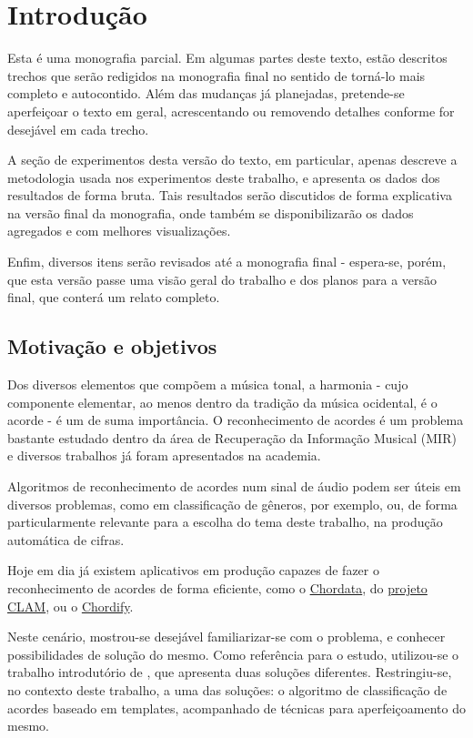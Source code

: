 \chapter{Introdução}
\label{cap:introducao}
    Esta é uma monografia parcial. Em algumas partes deste texto, estão descritos trechos que serão redigidos na monografia final no sentido de torná-lo mais completo e autocontido. Além das mudanças já planejadas, pretende-se aperfeiçoar o texto em geral, acrescentando ou removendo detalhes conforme for desejável em cada trecho.
    
    A seção de experimentos desta versão do texto, em particular, apenas descreve a metodologia usada nos experimentos deste trabalho, e apresenta os dados dos resultados de forma bruta. Tais resultados serão discutidos de forma explicativa na versão final da monografia, onde também se disponibilizarão os dados agregados e com melhores visualizações.
    
    Enfim, diversos itens serão revisados até a monografia final - espera-se, porém, que esta versão passe uma visão geral do trabalho e dos planos para a versão final, que conterá um relato completo.

\section{Motivação e objetivos}
    Dos diversos elementos que compõem a música tonal, a harmonia - cujo componente elementar, ao menos dentro da tradição da música ocidental, é o acorde - é um de suma importância. O reconhecimento de acordes é um problema bastante estudado dentro da área de Recuperação da Informação Musical (MIR) e diversos trabalhos já foram apresentados na academia.
    
    Algoritmos de reconhecimento de acordes num sinal de áudio podem ser úteis em diversos problemas, como em classificação de gêneros, por exemplo, ou, de forma particularmente relevante para a escolha do tema deste trabalho, na produção automática de cifras.
    
    Hoje em dia já existem aplicativos em produção capazes de fazer o reconhecimento de acordes de forma eficiente, como o \href{http://clam-project.org/wiki/Chordata_tutorial}{Chordata}, do \href{http://clam-project.org/index.html}{projeto CLAM}, ou o \href{https://chordify.net/}{Chordify}.
    
    Neste cenário, mostrou-se desejável familiarizar-se com o problema, e conhecer possibilidades de solução do mesmo. Como referência para o estudo, utilizou-se o trabalho introdutório de \cite{muller}, que apresenta duas soluções diferentes. Restringiu-se, no contexto deste trabalho, a uma das soluções: o algoritmo de classificação de acordes baseado em templates, acompanhado de técnicas para aperfeiçoamento do mesmo.

